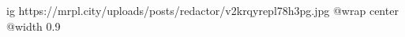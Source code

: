  
 
 
 
 

\ifcmt
  ig https://mrpl.city/uploads/posts/redactor/v2krqyrepl78h3pg.jpg
  @wrap center
  @width 0.9
\fi
